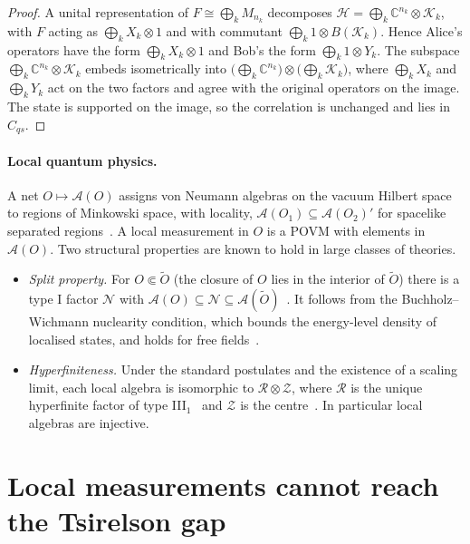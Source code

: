\documentclass[11pt]{article}
\theoremstyle{definition}\newtheorem{definition}{Definition}[section]
\theoremstyle{remark}\newtheorem*{remark}{Remark}
\newcommand{\Hil}{\mathcal H}
\newcommand{\A}{\mathcal A}
\newcommand{\N}{\mathcal N}
\newcommand{\Cqs}{C_{qs}}
\begin{document}
\begin{proof}
A unital representation of $F\cong\bigoplus_kM_{n_k}$ decomposes $\Hil=\bigoplus_k\mathbb C^{n_k}\otimes\mathcal K_k$, with $F$ acting as
$\bigoplus_kX_k\otimes1$ and with commutant $\bigoplus_k1\otimes B(\mathcal K_k)$. Hence Alice's operators have the form $\bigoplus_kX_k\otimes1$ and
Bob's the form $\bigoplus_k1\otimes Y_k$. The subspace $\bigoplus_k\mathbb C^{n_k}\otimes\mathcal K_k$ embeds isometrically into
$\bigl(\bigoplus_k\mathbb C^{n_k}\bigr)\otimes\bigl(\bigoplus_k\mathcal K_k\bigr)$, where $\bigoplus_kX_k$ and $\bigoplus_kY_k$ act on the two factors and agree with
the original operators on the image. The state is supported on the image, so the correlation is unchanged and lies in
$\Cqs$.
\end{proof}

\paragraph{Local quantum physics.} A net $O\mapsto\A(O)$ assigns von Neumann algebras on the vacuum Hilbert space to
regions of Minkowski space, with locality, $\A(O_1)\subseteq\A(O_2)'$ for spacelike separated regions~\cite{Haag}. A
local measurement in $O$ is a POVM with elements in $\A(O)$. Two structural properties are known to hold in large
classes of theories.
\begin{itemize}
\item \emph{Split property.} For $O\Subset\tilde O$ (the closure of $O$ lies in the interior of $\tilde O$) there is a type I
factor $\N$ with $\A(O)\subseteq\N\subseteq\A(\tilde O)$~\cite{DoplicherLongo}. It follows from the Buchholz--Wichmann
nuclearity condition, which bounds the energy-level density of localised states, and holds for free
fields~\cite{BuchholzWichmann}.
\item \emph{Hyperfiniteness.} Under the standard postulates and the existence of a scaling limit, each local algebra is
isomorphic to $\mathcal R\otimes\mathcal Z$, where $\mathcal R$ is the unique hyperfinite factor of type III$_1$~\cite{Haagerup}
and $\mathcal Z$ is the centre~\cite{BDF}. In particular local algebras are injective.
\end{itemize}

\section{Local measurements cannot reach the Tsirelson gap}
\label{sec:theorems}
\end{document}
